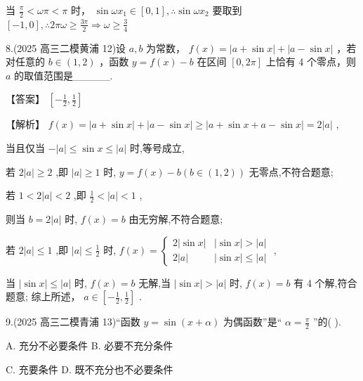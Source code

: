 \documentclass[10pt]{article}
\newcommand*\circled[1]{\tikz[baseline=(char.base)]{\node[shape=circle,draw,inner sep=1.5pt] (char) {\small #1};}}
\begin{document}
 \circled{2}  当 \(\frac{\pi }{2} < {\omega \pi } < \pi\) 时， \(\sin {\omega {x}_{1}} \in  \left\lbrack  {0,1}\right\rbrack  ,\therefore \sin {\omega {x}_{2}}\) 要取到 \(\left\lbrack  {-1,0}\right\rbrack  ,\therefore {2\pi \omega } \geq  \frac{3\pi }{2} \Rightarrow  \omega  \geq  \frac{3}{4}\)

8.(2025 高三二模黄浦 12)设 \(a,b\) 为常数， \(f\left( x\right)  = \left| {a + \sin x}\right|  + \left| {a - \sin x}\right|\) ，若对任意的 \(b \in  \left( {1,2}\right)\) ，函数 \(y = f\left( x\right)  - b\) 在区间 \(\left\lbrack  {0,{2\pi }}\right\rbrack\) 上恰有 4 个零点，则 \(a\) 的取值范围是\_\_\_\_\_.

【答案】 \(\left\lbrack  {-\frac{1}{2},\frac{1}{2}}\right\rbrack\)

【解析】 \(f\left( x\right)  = \left| {a + \sin x}\right|  + \left| {a - \sin x}\right|  \geq  \left| {a + \sin x + a - \sin x}\right|  = 2\left| a\right|\) ,

当且仅当 \(- \left| a\right|  \leq  \sin x \leq  \left| a\right|\) 时,等号成立,

若 \(2\left| a\right|  \geq  2\) ,即 \(\left| a\right|  \geq  1\) 时, \(y = f\left( x\right)  - b\left( {b \in  \left( {1,2}\right) }\right)\) 无零点,不符合题意;

若 \(1 < 2\left| a\right|  < 2\) ,即 \(\frac{1}{2} < \left| a\right|  < 1\) ,

则当 \(b = 2\left| a\right|\) 时, \(f\left( x\right)  = b\) 由无穷解,不符合题意;

若 \(2\left| a\right|  \leq  1\) ,即 \(\left| a\right|  \leq  \frac{1}{2}\) 时, \(f\left( x\right)  = \left\{  \begin{matrix} 2\left| {\sin x}\right| & \left| {\sin x}\right|  > \left| a\right| \\  2\left| a\right| & \left| {\sin x}\right|  \leq  \left| a\right|  \end{matrix}\right.\) ,

当 \(\left| {\sin x}\right|  \leq  \left| a\right|\) 时, \(f\left( x\right)  = b\) 无解,当 \(\left| {\sin x}\right|  > \left| a\right|\) 时, \(f\left( x\right)  = b\) 有 4 个解,符合题意; 综上所述， \(a \in  \left\lbrack  {-\frac{1}{2},\frac{1}{2}}\right\rbrack\) .

9.(2025 高三二模青浦 13)“函数 \(y = \sin \left( {x + \alpha }\right)\) 为偶函数”是“ \(\alpha  = \frac{\pi }{2}\) ”的( ).

A. 充分不必要条件 B. 必要不充分条件

C. 充要条件 D. 既不充分也不必要条件
\end{document}
